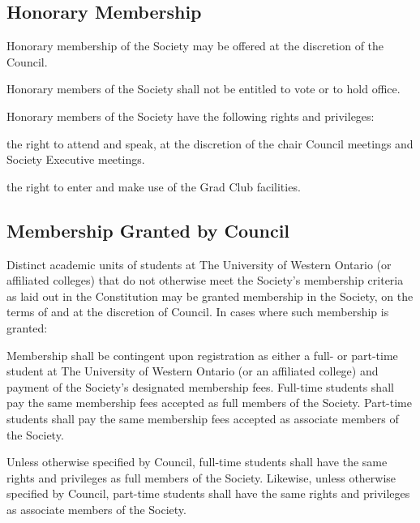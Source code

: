 \subsection{Honorary Membership}
	\begin{longenum}[label*=\thesubsection.\arabic*., align=left]
	\item Honorary membership of the Society may be offered at the discretion of the Council. 
    \item Honorary members of the Society shall not be entitled to vote or to hold office.
    \item Honorary members of the Society have the following rights and privileges:
    	\begin{longenum}[label*=\arabic*., align=left]
    	\item the right to attend and speak, at the discretion of the chair Council meetings and Society Executive meetings.
        \item the right to enter and make use of the Grad Club facilities.
  	\end{longenum}
\end{longenum}

\subsection{Membership Granted by Council}
	\begin{longenum}[label*=\thesubsection.\arabic*., align=left]
	\item Distinct academic units of students at The University of Western Ontario (or affiliated colleges) that do not otherwise meet the Society's membership criteria as laid out in the Constitution may be granted membership in the Society, on the terms of and at the discretion of Council. In cases where such membership is granted: 
    	\begin{longenum}[label*=\arabic*., align=left]
    	\item Membership shall be contingent upon registration as either a full- or part-time student at The University of  Western Ontario (or an affiliated college) and payment of the Society's designated membership fees. Full-time students shall pay the same membership fees accepted as full members of the Society. Part-time students shall pay the same membership fees accepted as associate members of the Society.
        \item Unless otherwise specified by Council, full-time students shall have the same rights and privileges as full members of the Society. Likewise, unless otherwise specified by Council, part-time students shall have the same rights and privileges as associate members of the Society.
  	\end{longenum}
\end{longenum}

